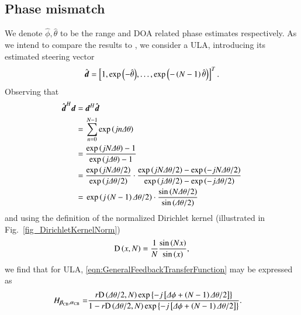 \subsection{Phase mismatch}
\label{subsec_error_trms}
We denote $\hat{\phi},\hat{\theta}$ to be the range and DOA related phase estimates respectively.
As we intend to compare the results to \cite{van2004optimum}, we consider a ULA, introducing its estimated steering vector
\begin{equation}\label{eq_est_d_ULA}
\hat{\boldsymbol{d}} = \left[{1, \exp{\left({-\hat{\theta}}\right)}, \hdots, \exp{\left({-\left({N-1}\right)\hat{\theta}}\right)}}\right]^{T}.
\end{equation}
Observing that
\begin{equation*}
    \begin{split}
        \hat{\boldsymbol{d}}^{H}\boldsymbol{d} =&\ \boldsymbol{d}^{H}\hat{\boldsymbol{d}}\\
        =&\ \sum_{n=0}^{N-1}\exp{\left({jn\Delta\theta}\right)} \\
        =&\ \frac{\exp{\left({jN\Delta\theta}\right)}-1}{\exp{\left({j\Delta\theta}\right)}-1}\\
        =&\ \frac{\exp{\left({jN\Delta\theta/2}\right)}}{\exp{\left({j\Delta\theta/2}\right)}}\cdot
        \frac{\exp{\left({jN\Delta\theta/2}\right)}-\exp{\left({-jN\Delta\theta/2}\right)}}
        {\exp{\left({j\Delta\theta/2}\right)}-\exp{\left({-j\Delta\theta/2}\right)}}\\
        =&\ \exp{\left({j\left({N-1}\right)\Delta\theta/2}\right)}\cdot
        \frac{\sin{\left({N\Delta\theta/2}\right)}}
        {\sin{\left({\Delta\theta/2}\right)}}
    \end{split}
\end{equation*}
and using the definition of the normalized Dirichlet kernel (illustrated in Fig.~\ref{fig_DirichletKernelNorm})
\[
\text{D}\left({x,N}\right)
=\frac{1}{N}\frac{\sin\left({Nx}\right)}{\sin\left({x}\right)},
\]
we find that for ULA, \eqref{eqn:GeneralFeedbackTransferFunction} may be expressed as
\begin{equation}\label{eq:alpha_beta_hat}
    \begin{split}
        H_{\boldsymbol{\beta}_{\text{CB}},\boldsymbol{\alpha}_{\text{CB}}}
        = &\frac{r\text{D}\left({\Delta\theta/2,N}\right)\exp\left\{{-j\left[{\Delta\phi+\left({N-1}\right)\Delta\theta/2}\right]}\right\}}{1-r\text{D}\left({\Delta\theta/2,N}\right)\exp\left\{{-j\left[{\Delta\phi+\left({N-1}\right)\Delta\theta/2}\right]}\right\}}.
    \end{split}
\end{equation}
